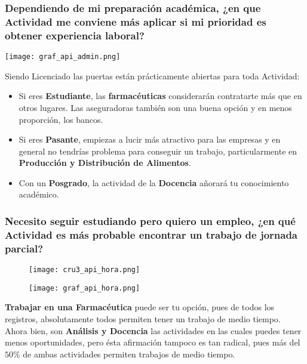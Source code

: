 \documentclass{article}
\begin{document}
\subsubsection{Dependiendo de mi preparación académica, ¿en que Actividad me conviene más aplicar si mi prioridad es obtener experiencia laboral?}

\begin{center}
    \texttt{[image: graf\_api\_admin.png]}
\end{center}

Siendo Licenciado las puertas están prácticamente abiertas para toda Actividad:

\begin{itemize}
    \item Si eres \textbf{Estudiante}, las \textbf{farmacéuticas} considerarán contratarte más que en otros lugares. Las aseguradoras también son una buena opción y en menos proporción, los bancos.
    
    \item Si eres \textbf{Pasante}, empiezas a lucir más atractivo para las empresas y en general no tendrías problema para conseguir un trabajo, particularmente en \textbf{Producción y Distribución de Alimentos}.
    
    \item Con un \textbf{Posgrado}, la actividad de la \textbf{Docencia} añorará tu conocimiento académico. 
\end{itemize}

\subsubsection{Necesito seguir estudiando pero quiero un empleo, ¿en qué Actividad es más probable encontrar un trabajo de jornada parcial?}

\begin{figure}[h!]
\centering
\begin{minipage}{.5\textwidth}
  \centering
  \texttt{[image: cru3\_api\_hora.png]}
\end{minipage}%
\begin{minipage}{.5\textwidth}
  \centering
  \texttt{[image: graf\_api\_hora.png]}
\end{minipage}
\end{figure}
\FloatBarrier

\textbf{Trabajar en una Farmacéutica} puede ser tu opción, pues de todos los registros, absolutamente todos permiten tener un trabajo de medio tiempo. Ahora bien, son \textbf{Análisis y Docencia} las actividades en las cuales puedes tener menos oportunidades, pero ésta afirmación tampoco es tan radical, pues más del $50\%$ de ambas actividades permiten trabajos de medio tiempo. 
\end{document}

